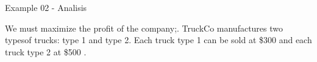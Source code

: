 \begin{frame}{Example 02 - Analisis}

We must maximize the profit of the company;. TruckCo manufactures
two typesof trucks: type 1 and type 2. Each truck type 1 can be sold
at \$300 and each truck type 2 at \$500 .


\end{frame}

